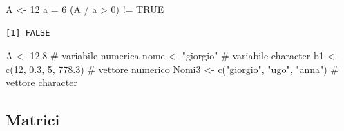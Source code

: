 \documentclass[
  ignorenonframetext,
  compress, aspectratio=149]{beamer}
\newenvironment{Shaded}{}{}
\newcommand{\CommentTok}[1]{\textcolor[rgb]{0.54,0.53,0.53}{#1}}
\newcommand{\ConstantTok}[1]{\textcolor[rgb]{0.67,0.33,0.00}{#1}}
\newcommand{\DecValTok}[1]{\textcolor[rgb]{0.69,0.50,0.00}{#1}}
\newcommand{\FloatTok}[1]{\textcolor[rgb]{0.69,0.50,0.00}{#1}}
\newcommand{\FunctionTok}[1]{\textcolor[rgb]{0.39,0.29,0.61}{#1}}
\newcommand{\NormalTok}[1]{\textcolor[rgb]{0.12,0.11,0.11}{#1}}
\newcommand{\OtherTok}[1]{\textcolor[rgb]{0.00,0.43,0.16}{#1}}
\newcommand{\SpecialCharTok}[1]{\textcolor[rgb]{0.24,0.68,0.91}{#1}}
\newcommand{\StringTok}[1]{\textcolor[rgb]{0.75,0.01,0.01}{#1}}
\begin{document}
\begin{frame}[fragile]{}
\label{section-9}
\begin{Shaded}
\begin{Highlighting}[]
\NormalTok{A }\OtherTok{\textless{}{-}} \DecValTok{12}
\NormalTok{a }\OtherTok{=} \DecValTok{6}
\NormalTok{(A }\SpecialCharTok{/}\NormalTok{ a }\SpecialCharTok{\textgreater{}} \DecValTok{0}\NormalTok{) }\SpecialCharTok{!=} \ConstantTok{TRUE}
\end{Highlighting}
\end{Shaded}

\begin{verbatim}
[1] FALSE
\end{verbatim}

\pause

\begin{Shaded}
\begin{Highlighting}[]
\NormalTok{A }\OtherTok{\textless{}{-}} \FloatTok{12.8} \CommentTok{\# variabile numerica}
\NormalTok{nome }\OtherTok{\textless{}{-}} \StringTok{"giorgio"}  \CommentTok{\# variabile character}
\NormalTok{b1 }\OtherTok{\textless{}{-}} \FunctionTok{c}\NormalTok{(}\DecValTok{12}\NormalTok{, }\FloatTok{0.3}\NormalTok{, }\DecValTok{5}\NormalTok{, }\FloatTok{778.3}\NormalTok{) }\CommentTok{\# vettore numerico}
\NormalTok{Nomi3 }\OtherTok{\textless{}{-}} \FunctionTok{c}\NormalTok{(}\StringTok{"giorgio"}\NormalTok{, }\StringTok{"ugo"}\NormalTok{, }\StringTok{"anna"}\NormalTok{) }\CommentTok{\# vettore character}
\end{Highlighting}
\end{Shaded}
\end{frame}

\subsection{Matrici}\label{matrici}
\end{document}
